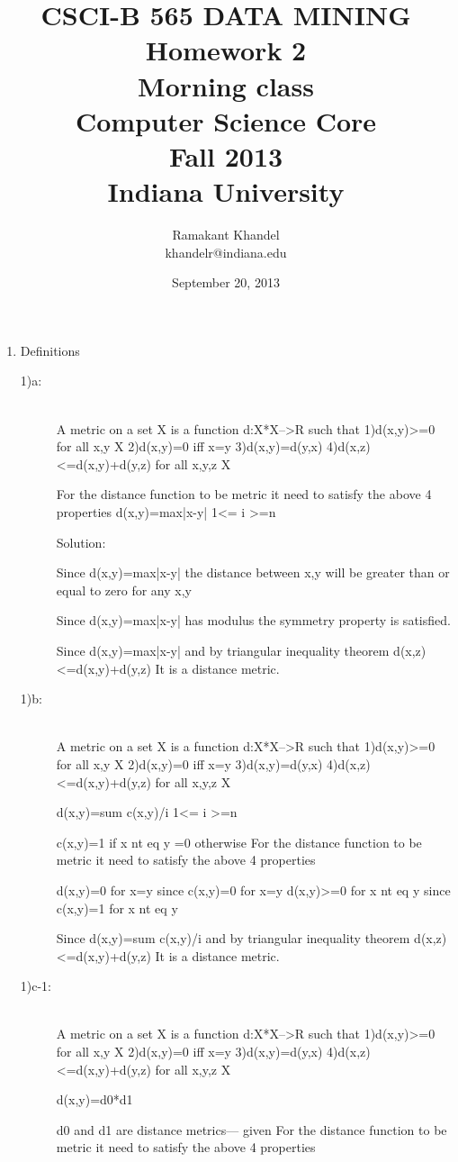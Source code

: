 \documentclass{article}
\title{ CSCI-B 565 DATA MINING\\
Homework 2\\
Morning class\\
Computer Science Core \\ Fall 2013 \\ Indiana University}
\author{ Ramakant Khandel \\ khandelr@indiana.edu\\}
\date {September 20, 2013}
\begin{document}
\maketitle
\begin{enumerate}
\item Definitions
\begin{description}

\item[1)a: ] \hfill \\
A metric on a set X is a function d:X*X-->R such that
1)d(x,y)>=0 for all x,y  X
2)d(x,y)=0 iff x=y
3)d(x,y)=d(y,x)
4)d(x,z)<=d(x,y)+d(y,z) for all x,y,z  X

For the distance function to be metric it need to satisfy the above 4 properties
d(x,y)=max{|x-y|}   1<= i >=n

Solution:

Since d(x,y)=max{|x-y|} the distance between x,y will be greater than or equal to zero for any x,y

Since d(x,y)=max{|x-y|} has modulus the symmetry property is satisfied.

Since d(x,y)=max{|x-y|} and by triangular inequality theorem
d(x,z)<=d(x,y)+d(y,z)
It is a distance metric.

\item[1)b: ] \hfill \\
A metric on a set X is a function d:X*X-->R such that
1)d(x,y)>=0 for all x,y  X
2)d(x,y)=0 iff x=y
3)d(x,y)=d(y,x)
4)d(x,z)<=d(x,y)+d(y,z) for all x,y,z  X

d(x,y)=sum c(x,y)/i  1<= i >=n

c(x,y)=1 if x nt eq y
      =0 otherwise
For the distance function to be metric it need to satisfy the above 4 properties

d(x,y)=0 for x=y since c(x,y)=0 for x=y
d(x,y)>=0 for x nt eq y since c(x,y)=1 for x nt eq y

Since d(x,y)=sum c(x,y)/i and by triangular inequality theorem
d(x,z)<=d(x,y)+d(y,z)
It is a distance metric.

\item[1)c-1: ] \hfill \\
A metric on a set X is a function d:X*X-->R such that
1)d(x,y)>=0 for all x,y  X
2)d(x,y)=0 iff x=y
3)d(x,y)=d(y,x)
4)d(x,z)<=d(x,y)+d(y,z) for all x,y,z  X

d(x,y)=d0*d1

d0 and d1 are distance metrics--- given
For the distance function to be metric it need to satisfy the above 4 properties


\end{description}
\end{enumerate}
\end{document}
